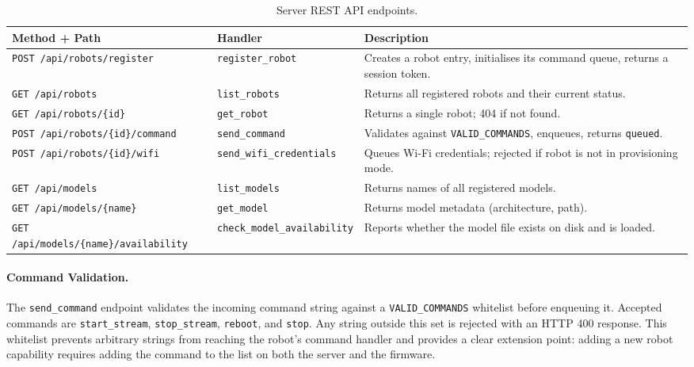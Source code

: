 \begin{table}[h]
	\centering
	\caption{Server REST API endpoints.}
	\label{tab:api_endpoints}
	\begin{tabular}{lp{5cm}p{5.5cm}}
		\hline
		\textbf{Method + Path} & \textbf{Handler} & \textbf{Description} \\
		\hline
		\texttt{POST /api/robots/register}
		& \texttt{register\_robot}
		& Creates a robot entry, initialises its command queue, returns a session token. \\
		\texttt{GET /api/robots}
		& \texttt{list\_robots}
		& Returns all registered robots and their current status. \\
		\texttt{GET /api/robots/\{id\}}
		& \texttt{get\_robot}
		& Returns a single robot; 404 if not found. \\
		\texttt{POST /api/robots/\{id\}/command}
		& \texttt{send\_command}
		& Validates against \texttt{VALID\_COMMANDS}, enqueues, returns \texttt{queued}. \\
		\texttt{POST /api/robots/\{id\}/wifi}
		& \texttt{send\_wifi\_credentials}
		& Queues Wi-Fi credentials; rejected if robot is not in provisioning mode. \\
		\texttt{GET /api/models}
		& \texttt{list\_models}
		& Returns names of all registered models. \\
		\texttt{GET /api/models/\{name\}}
		& \texttt{get\_model}
		& Returns model metadata (architecture, path). \\
		\texttt{GET /api/models/\{name\}/availability}
		& \texttt{check\_model\_availability}
		& Reports whether the model file exists on disk and is loaded. \\
		\hline
	\end{tabular}
\end{table}

\paragraph{Command Validation.}
The \texttt{send\_command} endpoint validates the incoming command
string against a \texttt{VALID\_COMMANDS} whitelist before enqueuing
it. Accepted commands are \texttt{start\_stream}, \texttt{stop\_stream},
\texttt{reboot}, and \texttt{stop}. Any string outside this set is
rejected with an HTTP 400 response. This whitelist prevents arbitrary
strings from reaching the robot's command handler and provides a clear
extension point: adding a new robot capability requires adding the
command to the list on both the server and the firmware.

